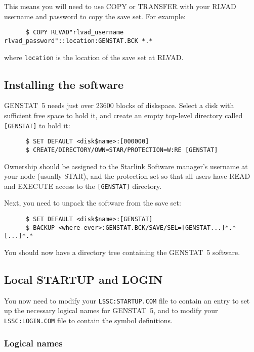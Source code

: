 This means you will need to use COPY or TRANSFER with your RLVAD username
and password to copy the save set. For example:
\begin{verbatim}
      $ COPY RLVAD"rlvad_username rlvad_password"::location:GENSTAT.BCK *.*
\end{verbatim}
where {\tt location} is the location of the save set at RLVAD.

\subsection{Installing the software}

GENSTAT~5 needs just over 23600 blocks of diskspace. Select a disk with
sufficient free space to hold it, and create an empty top-level
directory called {\tt [GENSTAT]} to hold it:
\begin{verbatim}
      $ SET DEFAULT <disk$name>:[000000]
      $ CREATE/DIRECTORY/OWN=STAR/PROTECTION=W:RE [GENSTAT]
\end{verbatim}
Ownership should be assigned to the Starlink Software manager's username at
your node (usually STAR), and the protection set so that all users have READ
and EXECUTE access to the {\tt [GENSTAT]} directory.

Next, you need to unpack the software from the save set:
\begin{verbatim}
      $	SET DEFAULT <disk$name>:[GENSTAT]
      $ BACKUP <where-ever>:GENSTAT.BCK/SAVE/SEL=[GENSTAT...]*.* [...]*.*
\end{verbatim}

You should now have a directory tree containing the GENSTAT~5 software.

\subsection{Local STARTUP and LOGIN}

You now need to modify your {\tt LSSC:STARTUP.COM} file to contain an entry to
set up  the necessary logical names for GENSTAT~5, and to modify your {\tt
LSSC:LOGIN.COM} file to contain the symbol definitions.

\subsubsection{Logical names}

